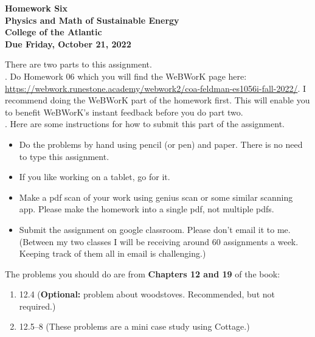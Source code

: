 \documentclass[12pt]{article}
\begin{document}
\pagestyle{empty}
 
\begin{center}
{\LARGE {\bf Homework Six}}\\
\bigskip
{\Large {\bf Physics and Math of Sustainable Energy}}\\
\bigskip
{\Large {\bf College of the Atlantic}}\\
\bigskip
{ {\bf Due Friday, October 21, 2022}}\\ 
\end{center}
\medskip


\noindent There are two parts to this assignment.\\

.  Do Homework 06 which you
will find the WeBWorK page here:
\url{https://webwork.runestone.academy/webwork2/coa-feldman-es1056i-fall-2022/}.
I recommend doing the WeBWorK part of the homework first.  This will
enable you to benefit WeBWorK's instant feedback before you do part
two.\\ 


.  Here are some
instructions for how to submit this part of the assignment.
\begin{itemize}
\item Do the problems by hand using pencil (or pen) and paper.
  There is no need to type this assignment.
\item If you like working on a tablet, go for it. 
\item Make a pdf scan of your work using genius scan or some
  similar scanning app.  Please make the homework into a single
  pdf, not multiple pdfs.
\item Submit the assignment on google classroom.  Please don't
  email it to me.  (Between my two classes I will be receiving
  around 60 assignments a week.  Keeping track of them all in email 
  is challenging.)\\
\end{itemize}

\noindent The problems you should do are from {\bf Chapters 12 and
  19} of the book:  \\

\begin{enumerate}
\setlength{\itemsep}{-1mm}
\item 12.4 ({\bf Optional:} problem about woodstoves. Recommended, but
  not required.)  
\item 12.5--8 (These problems are a mini case study using Cottage.)\\
\end{enumerate}
\end{document}
